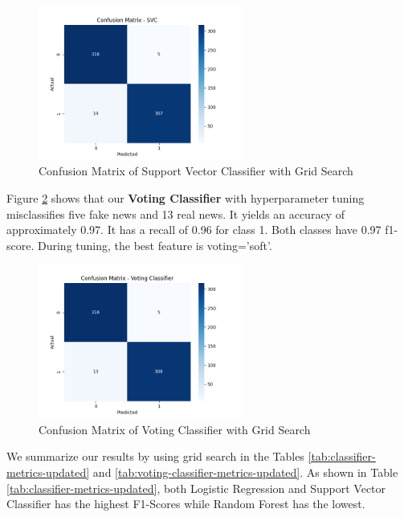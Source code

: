 \begin{figure}[ht]
\centering
\includegraphics[width=0.6\textwidth,height=0.6\textheight, keepaspectratio]{figures/withgridsearch/SVC.png}
  \caption{Confusion Matrix of Support Vector Classifier with Grid Search}
  \label{CMofSVCwGS}
\end{figure}

Figure \ref{CMofVCwGS} shows that our \textbf{Voting Classifier} with hyperparameter tuning misclassifies five fake news and 13 real news. It yields an accuracy of approximately 0.97. It has a recall of 0.96 for class 1. Both classes have 0.97 f1-score. During tuning, the best feature is voting='soft'.

\begin{figure}[ht]
\centering
\includegraphics[width=0.6\textwidth,height=0.6\textheight, keepaspectratio]{figures/withgridsearch/VC.png}
  \caption{Confusion Matrix of Voting Classifier with Grid Search}
  \label{CMofVCwGS}
\end{figure}

\clearpage

We summarize our results by using grid search in the Tables \ref{tab:classifier-metrics-updated} and \ref{tab:voting-classifier-metrics-updated}. As shown in Table \ref{tab:classifier-metrics-updated}, both Logistic Regression and Support Vector Classifier has the highest F1-Scores while Random Forest has the lowest.

